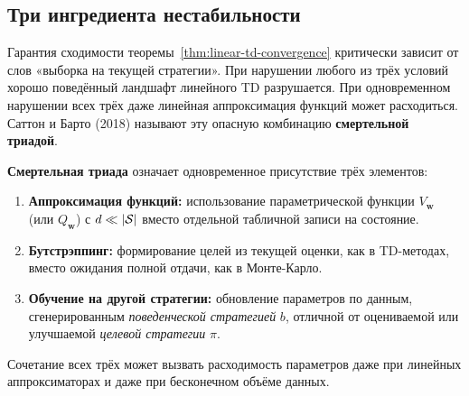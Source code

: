 \subsection{Три ингредиента нестабильности}

Гарантия сходимости теоремы~\ref{thm:linear-td-convergence} критически зависит от слов «выборка на текущей стратегии».  При нарушении любого из трёх условий хорошо поведённый ландшафт линейного TD разрушается.  При одновременном нарушении всех трёх даже линейная аппроксимация функций может расходиться.  Саттон и Барто (2018) называют эту опасную комбинацию \textbf{смертельной триадой}.

\begin{definition}
\label{def:deadly-triad}
\textbf{Смертельная триада} означает одновременное присутствие трёх элементов:
\begin{enumerate}
\item \textbf{Аппроксимация функций:} использование параметрической функции $V_\mathbf{w}$ (или $Q_\mathbf{w}$) с $d \ll |\mathcal{S}|$ вместо отдельной табличной записи на состояние.
\item \textbf{Бутстрэппинг:} формирование целей из текущей оценки, как в TD-методах, вместо ожидания полной отдачи, как в Монте-Карло.
\item \textbf{Обучение на другой стратегии:} обновление параметров по данным, сгенерированным \emph{поведенческой стратегией} $b$, отличной от оцениваемой или улучшаемой \emph{целевой стратегии} $\pi$.
\end{enumerate}
Сочетание всех трёх может вызвать расходимость параметров даже при линейных аппроксиматорах и даже при бесконечном объёме данных.
\end{definition}

